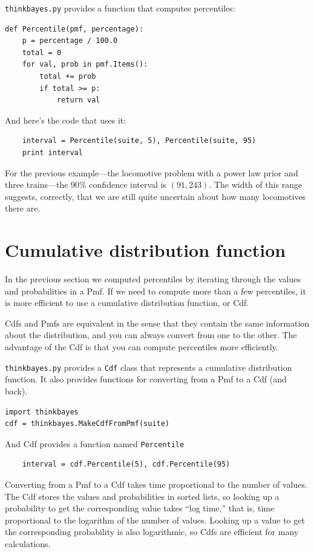 \documentclass[12pt]{book}
\begin{document}
\verb"thinkbayes.py" provides a function that computes percentiles:

\begin{verbatim}
def Percentile(pmf, percentage):
    p = percentage / 100.0
    total = 0
    for val, prob in pmf.Items():
        total += prob
        if total >= p:
            return val    
\end{verbatim}

And here's the code that uses it:

\begin{verbatim}
    interval = Percentile(suite, 5), Percentile(suite, 95)
    print interval
\end{verbatim}

For the previous example---the locomotive problem with a power law prior
and three trains---the 90\% confidence interval is $(91, 243)$.  The
width of this range suggests, correctly, that we are still quite
uncertain about how many locomotives there are.


\section{Cumulative distribution function}

In the previous section we computed percentiles by iterating through
the values and probabilities in a Pmf.  If we need to compute more
than a few percentiles, it is more efficient to use a cumulative
distribution function, or Cdf.

Cdfs and Pmfs are equivalent in the sense that they contain the
same information about the distribution, and you can always convert
from one to the other.  The advantage of the Cdf is that you can
compute percentiles more efficiently.

{\tt thinkbayes.py} provides a {\tt Cdf} class that represents a
cumulative distribution function.  It also provides functions for
converting from a Pmf to a Cdf (and back). 

\begin{verbatim}
import thinkbayes
cdf = thinkbayes.MakeCdfFromPmf(suite)
\end{verbatim}

And Cdf provides a function named \verb"Percentile"

\begin{verbatim}
    interval = cdf.Percentile(5), cdf.Percentile(95)
\end{verbatim}

Converting from a Pmf to a Cdf takes time proportional to the number
of values.  The Cdf stores the values and probabilities in sorted
lists, so looking up a probability to get the corresponding value
takes ``log time,'' that is, time proportional to the logarithm of the
number of values.  Looking up a value to get the corresponding
probability is also logarithmic, so Cdfs are efficient for many
calculations.
\end{document}
